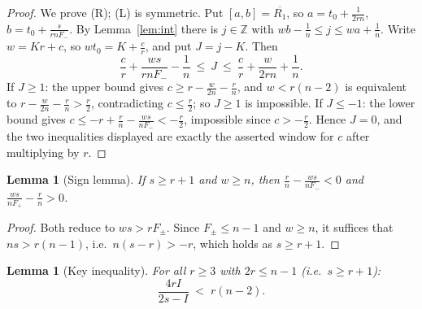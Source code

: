 \documentclass[11pt]{article}
\newtheorem{lemma}[theorem]{Lemma}
\theoremstyle{definition}
\newcommand{\Z}{\mathbb{Z}}
\begin{document}
\begin{proof}
We prove (R); (L) is symmetric. Put $[a,b]=\overline{R_1}$, so
$a=t_0+\frac1{2rn}$, $b=t_0+\frac{s}{rnF_-}$. By Lemma~\ref{lem:int} there
is $j\in\Z$ with $wb-\frac1n\le j\le wa+\frac1n$. Write $w=Kr+c$, so
$wt_0=K+\frac cr$, and put $J=j-K$. Then
\[
\frac cr+\frac{ws}{rnF_-}-\frac1n\ \le\ J\ \le\
\frac cr+\frac{w}{2rn}+\frac1n .
\]
If $J\ge1$: the upper bound gives
$c\ge r-\frac{w}{2n}-\frac rn$, and $w<r(n-2)$ is equivalent to
$r-\frac{w}{2n}-\frac rn>\frac r2$, contradicting $c\le\frac r2$; so
$J\ge1$ is impossible. If $J\le-1$: the lower
bound gives $c\le -r+\frac rn-\frac{ws}{nF_-}<-\frac r2$, impossible since
$c>-\frac r2$. Hence $J=0$, and the two inequalities displayed are exactly
the asserted window for $c$ after multiplying by $r$.
\end{proof}

\begin{lemma}[Sign lemma]\label{lem:sign}
If $s\ge r+1$ and $w\ge n$, then
$\frac rn-\frac{ws}{nF_-}<0$ and $\frac{ws}{nF_+}-\frac rn>0$.
\end{lemma}

\begin{proof}
Both reduce to $ws>rF_\pm$. Since $F_\pm\le n-1$ and $w\ge n$, it suffices
that $ns>r(n-1)$, i.e.\ $n(s-r)>-r$, which holds as $s\ge r+1$.
\end{proof}

\begin{lemma}[Key inequality]\label{lem:key}
For all $r\ge3$ with $2r\le n-1$ (i.e.\ $s\ge r+1$):
\[
\frac{4rI}{2s-I}\;<\;r(n-2).
\]
\end{lemma}
\end{document}
